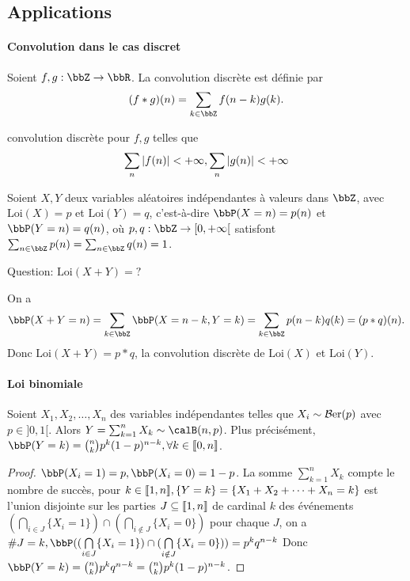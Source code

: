 \subsection{Applications}

\paragraph{Convolution dans le cas discret}

Soient $f, g: \bbZ \to \bbR$. La convolution discrète est définie par
\[ (f * g)(n) = \sum_{k \in \bbZ} f(n - k) g(k). \]

convolution discrète pour $f, g$ telles que
\[ \sum\limits_{n} \left\lvert f(n) \right\rvert < +\infty, \sum\limits_{n} \left\lvert g(n) \right\rvert < +\infty \]

Soient $X, Y$ deux variables aléatoires indépendantes à valeurs dans $\bbZ$,
avec $\mathrm{Loi}(X) = {}p$ et $\mathrm{Loi}(Y) = {}q$, c'est-à-dire
$\bbP(X = n) = {}p(n)$ et $\bbP(Y = n) = {}q(n)$, où
${}p, {}q: \bbZ \to [0, +\infty[$ satisfont $\sum_{n \in \bbZ} {}p(n) = \sum_{n \in \bbZ} {}q(n) = 1$.

Question: $\mathrm{Loi}(X + Y) = ?$

On a
\[ \bbP(X + Y = n) = \sum_{k \in \bbZ} \bbP(X = n - k, Y = k)
    = \sum_{k \in \bbZ} {}p(n - k) {}q(k) = ({}p * {}q)(n). \]
Donc $\mathrm{Loi}(X + Y) = {}p * {}q$, la convolution discrète de $\mathrm{Loi}(X)$ et $\mathrm{Loi}(Y)$.

\paragraph{Loi binomiale}

\begin{prop}
    Soient $X_1, X_2, \ldots, X_n$ des variables indépendantes telles que $X_i \sim \operatorname{\mathcal{B}er}(p)$ avec $p \in ]0, 1[$.
    Alors $Y = \sum_{k = 1}^n X_k \sim \calB(n, p)$.
    Plus précisément, $\bbP(Y = k) = \binom{n}{k} p^k (1-p)^{n-k}, \forall k \in \llb 0, n \rrb$.
\end{prop}

\begin{proof}
    $\bbP(X_i = 1) = p, \bbP(X_i = 0) = 1 - p$.
    La somme $\sum_{k = 1}^n X_k$ compte le nombre de succès,
    pour $k \in \llbracket 1, n \rrbracket, \{ Y = k \} = \{ X_1 + X_2 + \cdots + X_n = k \}$
    est l'union disjointe sur les parties $J \subseteq \llbracket 1, n \rrbracket$ de cardinal $k$
    des événements $\left(\bigcap_{i \in J} \{ X_i = 1 \}\right) \cap \left(\bigcap_{i \notin J} \{ X_i = 0 \}\right)$
    pour chaque $J$, on a $\# J = k, \bbP((\bigcap\limits_{i \in J} \{ X_i = 1 \}) \cap (\bigcap\limits_{i \notin J} \{ X_i = 0 \})) = p^k q^{n-k}$
    Donc $\bbP(Y = k) = \binom{n}{k} p^k q^{n - k} = \binom{n}{k} p^k (1-p)^{n-k}$.
\end{proof}

